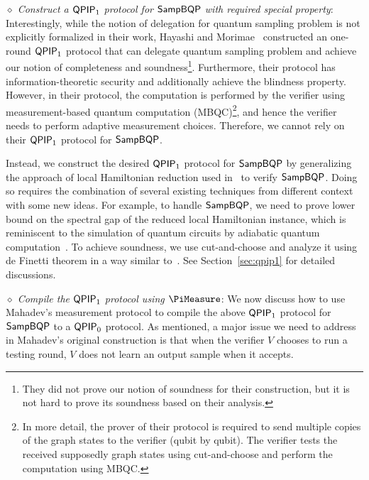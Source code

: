 
\emph{$\diamond$ Construct a $\operatorname{\mathsf{QPIP}}_1$ protocol for $\operatorname{\mathsf{SampBQP}}$ with required special property}: Interestingly, while the notion of delegation for quantum sampling problem is not explicitly formalized in their work, Hayashi and Morimae~\cite{hayashi2015verifiable} constructed an one-round $\operatorname{\mathsf{QPIP}}_1$ protocol that can delegate quantum sampling problem and achieve our notion of completeness and soundness\footnote{They did not prove our notion of soundness for their construction, but it is not hard to prove its soundness based on their analysis.}. Furthermore, their protocol has information-theoretic security and additionally achieve the blindness property. However, in their protocol, the computation is performed by the verifier using measurement-based quantum computation (MBQC)\footnote{In more detail, the prover of their protocol is required to send multiple copies of the graph states to the verifier (qubit by qubit). The verifier tests the received supposedly graph states using cut-and-choose and perform the computation using MBQC.}, and hence the verifier needs to perform adaptive measurement choices. Therefore, we cannot rely on their $\operatorname{\mathsf{QPIP}}_1$ protocol for $\operatorname{\mathsf{SampBQP}}$. 

Instead, we construct the desired $\operatorname{\mathsf{QPIP}}_1$ protocol for $\operatorname{\mathsf{SampBQP}}$ by generalizing the approach of local Hamiltonian reduction used in~\cite{PhysRevA.93.022326, mf16} to verify $\operatorname{\mathsf{SampBQP}}$. Doing so requires the combination of several existing techniques from different context with some new ideas. For example, to handle $\operatorname{\mathsf{SampBQP}}$, we need to prove lower bound on the spectral gap of the reduced local Hamiltonian instance, which is reminiscent to the simulation of quantum circuits by adiabatic quantum computation~\cite{adiabatic}. To achieve soundness, we use cut-and-choose and analyze it using de Finetti theorem in a  way similar to~\cite{takeuchi2018verification,hayashi2015verifiable}. See Section~\ref{sec:qpip1} for detailed discussions.



\emph{$\diamond$ Compile the $\operatorname{\mathsf{QPIP}}_1$ protocol using $\PiMeasure$}: We now discuss how to use Mahadev's measurement protocol to compile the above $\operatorname{\mathsf{QPIP}}_1$ protocol for $\operatorname{\mathsf{SampBQP}}$ to a $\operatorname{\mathsf{QPIP}}_0$ protocol. As mentioned, a major issue we need to address in Mahadev's original construction is that when the verifier $V$ chooses to run a testing round, $V$ does not learn an output sample when it accepts.  %

